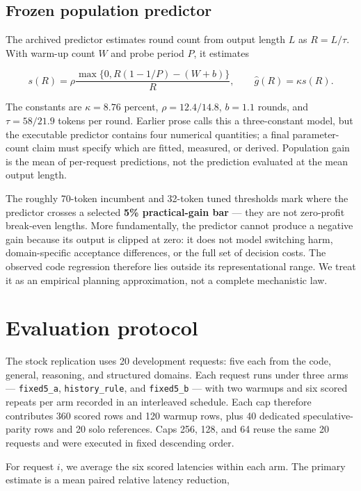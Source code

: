 \documentclass[
  11pt,
]{article}
\begin{document}
\subsection{Frozen population
predictor}\label{frozen-population-predictor}

The archived predictor estimates round count from output length \(L\) as
\(R=L/\tau\). With warm-up count \(W\) and probe period \(P\), it
estimates

\[
s(R)=\rho\frac{\max\{0,R(1-1/P)-(W+b)\}}{R},\qquad
\widehat g(R)=\kappa s(R).
\]

The constants are \(\kappa=8.76\) percent, \(\rho=12.4/14.8\), \(b=1.1\)
rounds, and \(\tau=58/21.9\) tokens per round. Earlier prose calls this
a three-constant model, but the executable predictor contains four
numerical quantities; a final parameter-count claim must specify which
are fitted, measured, or derived. Population gain is the mean of
per-request predictions, not the prediction evaluated at the mean output
length.

The roughly 70-token incumbent and 32-token tuned thresholds mark where
the predictor crosses a selected \textbf{5\% practical-gain bar} ---
they are not zero-profit break-even lengths. More fundamentally, the
predictor cannot produce a negative gain because its output is clipped
at zero: it does not model switching harm, domain-specific acceptance
differences, or the full set of decision costs. The observed code
regression therefore lies outside its representational range. We treat
it as an empirical planning approximation, not a complete mechanistic
law.

\section{Evaluation protocol}\label{evaluation-protocol}

The stock replication uses 20 development requests: five each from the
code, general, reasoning, and structured domains. Each request runs
under three arms --- \texttt{fixed5\_a}, \texttt{history\_rule}, and
\texttt{fixed5\_b} --- with two warmups and six scored repeats per arm
recorded in an interleaved schedule. Each cap therefore contributes 360
scored rows and 120 warmup rows, plus 40 dedicated speculative-parity
rows and 20 solo references. Caps 256, 128, and 64 reuse the same 20
requests and were executed in fixed descending order.

For request \(i\), we average the six scored latencies within each arm.
The primary estimate is a mean paired relative latency reduction,
\end{document}
